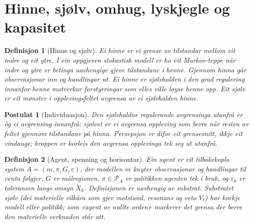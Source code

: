 \documentclass[9pt,twocolumn,a4paper]{article}
\theoremstyle{defstyle}
\newtheorem{definisjon}{Definisjon}
\newtheorem{postulat}{Postulat}
\theoremstyle{formstyle}
\begin{document}
\section{Hinne, sjølv, omhug, lyskjegle og kapasitet}

\begin{definisjon}[Hinne og sjølv]
Ei \emph{hinne} er ei grense av tilstandar mellom eit indre og eit ytre. I ein oppgjeven stokastisk modell er ho eit Markov-teppe når indre og ytre er betinga uavhengige gjeve tilstandane i henne. Gjennom hinna går observasjonar inn og handlingar ut. Ei hinne er \emph{sjølvhalden} i den grad regulering innanfor henne motverkar forstyrringar som elles ville løyse henne opp. Eit \emph{sjølv} er eit mønster i opplevingsfeltet avgrensa av ei sjølvhalden hinne.
\end{definisjon}

\begin{postulat}[Individuasjon]
Den sjølvhaldne regulerande avgrensinga utanfrå er òg ei avgrensing innanfrå: sjølvet er ei avgrensa oppleving som berre når resten av feltet gjennom tilstandane på hinna. Persepsjon er difor eit grensesnitt, ikkje eit vindauge; kroppen er korleis den avgrensa opplevinga tek seg ut utanfrå.
\end{postulat}

\begin{definisjon}[Agent, spenning og horisontar]
Ein \emph{agent} er eit tilbakekopla system $A = (m, \pi, G, \varepsilon)$, der modellen $m$ knyter observasjonar og handlingar til venta følgjer, $G$ er målregionen, $\pi \in \mathcal{P}_A$ er politikken agenten tek i bruk, og $\varepsilon_k$ er toleransen langs omsyn $X_k$. Definisjonen er uavhengig av substrat. Substratet sjølv (dei materielle vilkåra som gjev motstand, resonans og veto $V_t$) har korkje modell eller politikk; som «agent av nullte orden» markerer det grensa der berre den materielle verknaden står att.
\end{definisjon}
\end{document}
